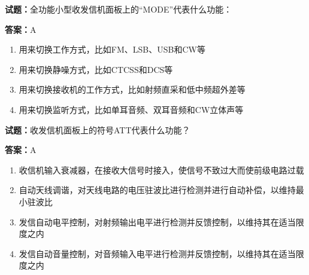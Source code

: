 \documentclass{ctexbook}
\begin{document}




\vspace{1em}

\textbf{试题：}全功能小型收发信机面板上的“MODE”代表什么功能： 

\textbf{答案：}A 

\begin{enumerate}[leftmargin=3em]
  \item 用来切换工作方式，比如FM、LSB、USB和CW等 

  \item 用来切换静噪方式，比如CTCSS和DCS等 

  \item 用来切换接收机的工作方式，比如射频直采和低中频超外差等 

  \item 用来切换监听方式，比如单耳音频、双耳音频和CW立体声等 

\end{enumerate}





\vspace{1em}

\textbf{试题：}收发信机面板上的符号ATT代表什么功能？ 

\textbf{答案：}A 

\begin{enumerate}[leftmargin=3em]
  \item 收信机输入衰减器，在接收大信号时接入，使信号不致过大而使前级电路过载 

  \item 自动天线调谐，对天线电路的电压驻波比进行检测并进行自动补偿，以维持最小驻波比 

  \item 发信自动电平控制，对射频输出电平进行检测并反馈控制，以维持其在适当限度之内 

  \item 发信自动音量控制，对音频输入电平进行检测并反馈控制，以维持其在适当限度之内 

\end{enumerate}






\vspace{1em}
\end{document}
